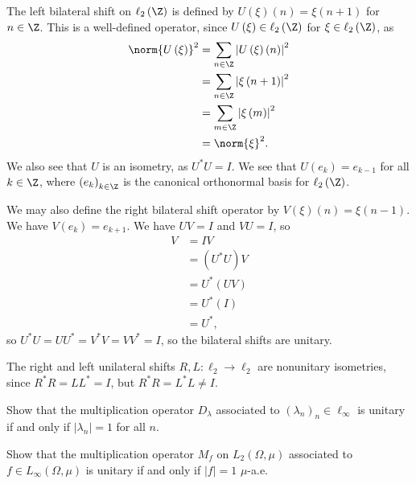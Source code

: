 \documentclass[10pt]{mypackage}
\begin{document}
\begin{example}
  The left bilateral shift on $\ell_2\left(\Z\right)$ is defined by $U\left(\xi\right)\left(n\right) = \xi\left(n+1\right)$ for $n\in \Z$. This is a well-defined operator, since $U\left(\xi\right)\in \ell_2\left(\Z\right)$ for $\xi \in \ell_2\left(\Z\right)$, as
  \begin{align*}
    \norm{U\left(\xi\right)}^2 &= \sum_{n\in \Z}\left\vert U\left(\xi\right)\left(n\right) \right\vert^2\\
                               &= \sum_{n\in \Z}\left\vert \xi\left(n+1\right) \right\vert^2\\
                               &= \sum_{m\in \Z}\left\vert \xi\left(m\right) \right\vert^2\\
                               &= \norm{\xi}^2.
  \end{align*}
  We also see that $U$ is an isometry, as $U^{\ast}U = I$. We see that $U\left(e_k\right) = e_{k-1}$ for all $k\in \Z$, where $\left(e_k\right)_{k\in \Z}$ is the canonical orthonormal basis for $\ell_2\left(\Z\right)$.\newline

  We may also define the right bilateral shift operator by $V\left(\xi\right)\left(n\right) = \xi\left(n-1\right)$. We have $V\left(e_k\right) = e_{k+1}$. We have $UV = I$ and $VU = I$, so
  \begin{align*}
    V &= IV\\
      &= \left(U^{\ast}U\right)V\\
      &= U^{\ast}\left(UV\right)\\
      &= U^{\ast}\left(I\right)\\
      &= U^{\ast},
  \end{align*}
  so $U^{\ast}U = UU^{\ast} = V^{\ast}V = VV^{\ast} = I$, so the bilateral shifts are unitary.
\end{example}
\begin{example}
  The right and left unilateral shifts $R,L: \ell_2\rightarrow \ell_2$ are nonunitary isometries, since $R^{\ast}R = LL^{\ast} = I$, but $R^{\ast}R = L^{\ast}L \neq I$.
\end{example}
\begin{exercise}
  Show that the multiplication operator $D_{\lambda}$ associated to $\left(\lambda_n\right)_n\in \ell_{\infty}$ is unitary if and only if $\left\vert \lambda_n \right\vert = 1$ for all $n$.\newline

  Show that the multiplication operator $M_{f}$ on $L_2\left(\Omega,\mu\right)$ associated to $f\in L_{\infty}\left(\Omega,\mu\right)$ is unitary if and only if $\left\vert f \right\vert = 1$ $\mu$-a.e.
\end{exercise}
\end{document}
